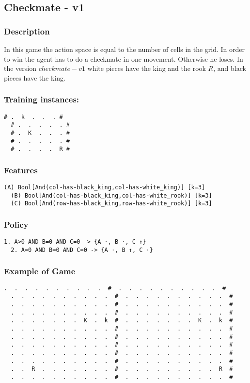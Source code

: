 \documentclass[a4paper]{article}
\begin{document}
\subsection{Checkmate - v1}
\subsubsection{Description}
In this game the action space is equal to the number of cells in the grid. In order to win the agent has to do a checkmate in one movement. Otherwise he loses. In the version $checkmate-v1$ white pieces have the king and the rook $R$, and black pieces have the king.

\subsubsection{Training instances:}
\begin{Verbatim}[fontsize=\footnotesize]
  # .  k  .  .  . #
  # .  .  .  .  . #
  # .  K  .  .  . #
  # .  .  .  .  . #
  # .  .  .  .  R #
\end{Verbatim}

\subsubsection{Features}
\begin{Verbatim}[fontsize=\footnotesize]
  (A) Bool[And(col-has-black_king,col-has-white_king)] [k=3]
  (B) Bool[And(col-has-black_king,col-has-white_rook)] [k=3]
  (C) Bool[And(row-has-black_king,row-has-white_rook)] [k=3]

\end{Verbatim}

\subsubsection{Policy}
\begin{Verbatim}[fontsize=\footnotesize]
  1. A>0 AND B=0 AND C=0 -> {A ·, B ·, C ↑}
  2. A=0 AND B=0 AND C=0 -> {A ·, B ↑, C ·}
\end{Verbatim}

\subsubsection{Example of Game}
\begin{Verbatim}[fontsize=\footnotesize]
  .  .  .  .  .  .  .  .  .  .  #  .  .  .  .  .  .  .  .  .  .  #
  .  .  .  .  .  .  .  .  .  .  #  .  .  .  .  .  .  .  .  .  .  #
  .  .  .  .  .  .  .  .  .  .  #  .  .  .  .  .  .  .  .  .  .  #
  .  .  .  .  .  .  .  .  .  .  #  .  .  .  .  .  .  .  .  .  .  #
  .  .  .  .  .  .  .  K  .  k  #  .  .  .  .  .  .  .  K  .  k  #
  .  .  .  .  .  .  .  .  .  .  #  .  .  .  .  .  .  .  .  .  .  #
  .  .  .  .  .  .  .  .  .  .  #  .  .  .  .  .  .  .  .  .  .  #
  .  .  .  .  .  .  .  .  .  .  #  .  .  .  .  .  .  .  .  .  .  #
  .  .  .  .  .  .  .  .  .  .  #  .  .  .  .  .  .  .  .  .  .  #
  .  .  .  .  .  .  .  .  .  .  #  .  .  .  .  .  .  .  .  .  .  #
  .  .  R  .  .  .  .  .  .  .  #  .  .  .  .  .  .  .  .  .  R  #
  .  .  .  .  .  .  .  .  .  .  #  .  .  .  .  .  .  .  .  .  .  #
\end{Verbatim}
\end{document}
